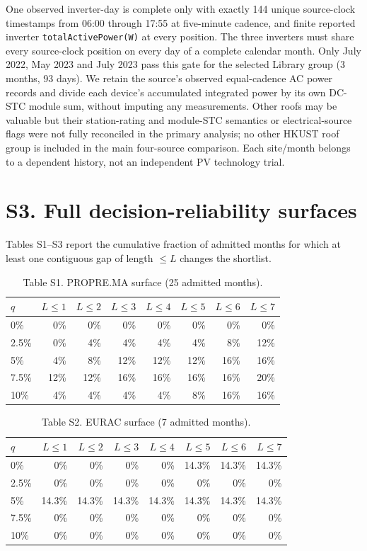 \documentclass[11pt]{article}
\begin{document}
One observed inverter-day is complete only with exactly 144 unique source-clock timestamps from 06:00 through 17:55 at five-minute cadence, and finite reported inverter \texttt{totalActivePower(W)} at every position. The three inverters must share every source-clock position on every day of a complete calendar month. Only July 2022, May 2023 and July 2023 pass this gate for the selected Library group (3 months, 93 days). We retain the source's observed equal-cadence AC power records and divide each device's accumulated integrated power by its own DC-STC module sum, without imputing any measurements. Other roofs may be valuable but their station-rating and module-STC semantics or electrical-source flags were not fully reconciled in the primary analysis; no other HKUST roof group is included in the main four-source comparison. Each site/month belongs to a dependent history, not an independent PV technology trial.

\section*{S3. Full decision-reliability surfaces}
Tables S1--S3 report the cumulative fraction of admitted months for which at least one contiguous gap of length $\le L$ changes the shortlist.

\begin{table}[h]
\centering
\caption*{Table S1. PROPRE.MA surface (25 admitted months).}
\begin{tabular}{lrrrrrrr}
\toprule
$q$ & $L\le1$ & $L\le2$ & $L\le3$ & $L\le4$ & $L\le5$ & $L\le6$ & $L\le7$ \\
\midrule
0\% & 0\% & 0\% & 0\% & 0\% & 0\% & 0\% & 0\% \\
2.5\% & 0\% & 4\% & 4\% & 4\% & 4\% & 8\% & 12\% \\
5\% & 4\% & 8\% & 12\% & 12\% & 12\% & 16\% & 16\% \\
7.5\% & 12\% & 12\% & 16\% & 16\% & 16\% & 16\% & 20\% \\
10\% & 4\% & 4\% & 4\% & 4\% & 8\% & 16\% & 16\% \\
\bottomrule
\end{tabular}
\end{table}

\begin{table}[h]
\centering
\caption*{Table S2. EURAC surface (7 admitted months).}
\begin{tabular}{lrrrrrrr}
\toprule
$q$ & $L\le1$ & $L\le2$ & $L\le3$ & $L\le4$ & $L\le5$ & $L\le6$ & $L\le7$ \\
\midrule
0\% & 0\% & 0\% & 0\% & 0\% & 14.3\% & 14.3\% & 14.3\% \\
2.5\% & 0\% & 0\% & 0\% & 0\% & 0\% & 0\% & 0\% \\
5\% & 14.3\% & 14.3\% & 14.3\% & 14.3\% & 14.3\% & 14.3\% & 14.3\% \\
7.5\% & 0\% & 0\% & 0\% & 0\% & 0\% & 0\% & 0\% \\
10\% & 0\% & 0\% & 0\% & 0\% & 0\% & 0\% & 0\% \\
\bottomrule
\end{tabular}
\end{table}
\end{document}
